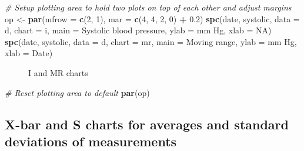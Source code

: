 \documentclass[
]{book}
\makeatletter
\newenvironment{Shaded}{\begin{snugshade}}{\end{snugshade}}
\newcommand{\AttributeTok}[1]{\textcolor[rgb]{0.13,0.29,0.53}{#1}}
\newcommand{\CommentTok}[1]{\textcolor[rgb]{0.56,0.35,0.01}{\textit{#1}}}
\newcommand{\ConstantTok}[1]{\textcolor[rgb]{0.56,0.35,0.01}{#1}}
\newcommand{\DecValTok}[1]{\textcolor[rgb]{0.00,0.00,0.81}{#1}}
\newcommand{\FloatTok}[1]{\textcolor[rgb]{0.00,0.00,0.81}{#1}}
\newcommand{\FunctionTok}[1]{\textcolor[rgb]{0.13,0.29,0.53}{\textbf{#1}}}
\newcommand{\NormalTok}[1]{#1}
\newcommand{\OtherTok}[1]{\textcolor[rgb]{0.56,0.35,0.01}{#1}}
\newcommand{\SpecialCharTok}[1]{\textcolor[rgb]{0.81,0.36,0.00}{\textbf{#1}}}
\newcommand{\StringTok}[1]{\textcolor[rgb]{0.31,0.60,0.02}{#1}}
\newcommand*\pandocbounded[1]{%
  \sbox\pandoc@box{#1}%
  \Gscale@div\@tempa{\textheight}{\dimexpr\ht\pandoc@box+\dp\pandoc@box\relax}%
  \Gscale@div\@tempb{\linewidth}{\wd\pandoc@box}%
  \ifdim\@tempb\p@<\@tempa\p@\let\@tempa\@tempb\fi%
  \ifdim\@tempa\p@<\p@\scalebox{\@tempa}{\usebox\pandoc@box}%
  \else\usebox{\pandoc@box}%
  \fi%
}
\makeatother
\begin{document}
\begin{Shaded}
\begin{Highlighting}[]
\CommentTok{\# Setup plotting area to hold two plots on top of each other and adjust margins}
\NormalTok{op }\OtherTok{\textless{}{-}} \FunctionTok{par}\NormalTok{(}\AttributeTok{mfrow =} \FunctionTok{c}\NormalTok{(}\DecValTok{2}\NormalTok{, }\DecValTok{1}\NormalTok{),}
          \AttributeTok{mar   =} \FunctionTok{c}\NormalTok{(}\DecValTok{4}\NormalTok{, }\DecValTok{4}\NormalTok{, }\DecValTok{2}\NormalTok{, }\DecValTok{0}\NormalTok{) }\SpecialCharTok{+} \FloatTok{0.2}\NormalTok{)}
\FunctionTok{spc}\NormalTok{(date, systolic, }
    \AttributeTok{data  =}\NormalTok{ d, }
    \AttributeTok{chart =} \StringTok{\textquotesingle{}i\textquotesingle{}}\NormalTok{,}
    \AttributeTok{main  =} \StringTok{\textquotesingle{}Systolic blood pressure\textquotesingle{}}\NormalTok{,}
    \AttributeTok{ylab  =} \StringTok{\textquotesingle{}mm Hg\textquotesingle{}}\NormalTok{,}
    \AttributeTok{xlab  =} \ConstantTok{NA}\NormalTok{)}
\FunctionTok{spc}\NormalTok{(date, systolic, }
    \AttributeTok{data  =}\NormalTok{ d, }
    \AttributeTok{chart =} \StringTok{\textquotesingle{}mr\textquotesingle{}}\NormalTok{,}
    \AttributeTok{main  =} \StringTok{\textquotesingle{}Moving range\textquotesingle{}}\NormalTok{,}
    \AttributeTok{ylab  =} \StringTok{\textquotesingle{}mm Hg\textquotesingle{}}\NormalTok{,}
    \AttributeTok{xlab  =} \StringTok{\textquotesingle{}Date\textquotesingle{}}\NormalTok{)}
\end{Highlighting}
\end{Shaded}

\begin{figure}
\centering
\pandocbounded{}
\caption{\label{fig:rfun-imr}I and MR charts}
\end{figure}

\begin{Shaded}
\begin{Highlighting}[]
\CommentTok{\# Reset plotting area to default}
\FunctionTok{par}\NormalTok{(op)}
\end{Highlighting}
\end{Shaded}

\subsection{X-bar and S charts for averages and standard deviations of measurements}\label{x-bar-and-s-charts-for-averages-and-standard-deviations-of-measurements}
\end{document}
